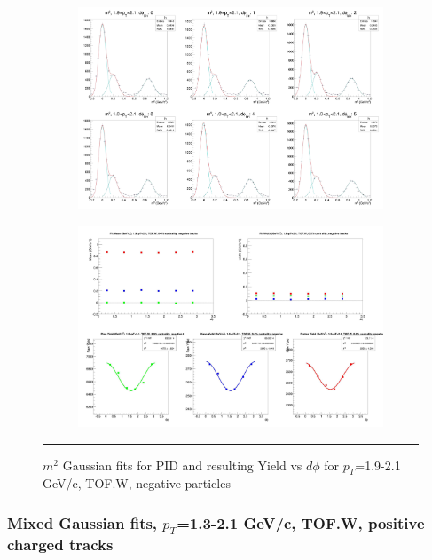 \begin{figure}[H]
  \centering
    \begin{subfigure}[p]{1\textwidth}
    \includegraphics[width=1\textwidth]{lowptfits/yieldvsdphi_tof1_cent0_ch0_pT-19-21.jpg}
    \end{subfigure}
    \begin{subfigure}[p]{1\textwidth}
    \includegraphics[width=1\textwidth]{lowptfits/fitParams_tof1_cent0_ch0_pT-19-21.jpg}
    \end{subfigure}
    \rule{35em}{0.5pt}
  \caption[PID fits and Yield vs $d\phi$ for $p_T$=1.9-2.1 GeV/c, TOF.W, negative particles ]{$m^2$ Gaussian fits for PID and resulting Yield vs $d\phi$ for $p_T$=1.9-2.1 GeV/c, TOF.W, negative particles}
  \label{fig:fits19-21neg}
\end{figure}

\subsubsection{Mixed Gaussian fits, $p_T$=1.3-2.1 GeV/c, TOF.W, positive charged tracks}


